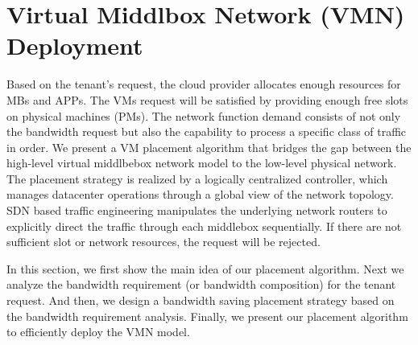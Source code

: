 \documentclass[review]{elsarticle}
\begin{document}

\section{Virtual Middlbox Network (VMN) Deployment}\label{sec:algorithm}
Based on the tenant's request, the cloud provider allocates enough resources for MBs and APPs. The VMs request will be satisfied by providing enough free slots on physical machines (PMs). The network function demand consists of not only the bandwidth request but also the capability to process a specific class of traffic in order. We present a VM placement algorithm that bridges the gap between the high-level virtual middlbebox network model to the low-level physical network. The placement strategy is realized by a logically centralized controller, which manages datacenter operations through a global view of the network topology. SDN based traffic engineering manipulates the underlying network routers to explicitly direct the traffic through each middlebox sequentially. If there are not sufficient slot or network resources, the request will be rejected. 

In this section, we first show the main idea of our placement algorithm. Next we analyze the bandwidth requirement (or bandwidth composition) for the tenant request. And then, we design a bandwidth saving placement strategy based on the bandwidth requirement analysis. Finally, we present our placement algorithm to efficiently deploy the VMN model. 
\end{document}
